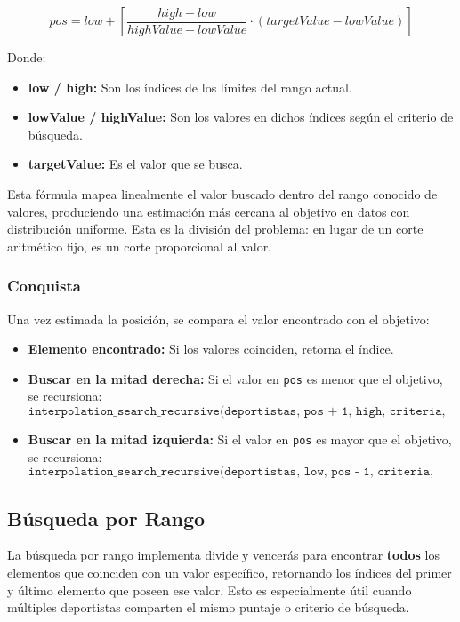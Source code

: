 \begin{equation}
    pos = low + \left[ \frac{high - low}{highValue - lowValue} \cdot (targetValue - lowValue) \right]
\end{equation}

Donde:
\begin{itemize}
    \item \textbf{low / high:} Son los índices de los límites del rango actual.
    \item \textbf{lowValue / highValue:} Son los valores en dichos índices según el criterio de búsqueda.
    \item \textbf{targetValue:} Es el valor que se busca.
\end{itemize}

Esta fórmula mapea linealmente el valor buscado dentro del rango conocido de valores, produciendo una estimación más cercana al objetivo en datos con distribución uniforme. Esta es la división del problema: en lugar de un corte aritmético fijo, es un corte proporcional al valor.

\subsubsection{Conquista}
Una vez estimada la posición, se compara el valor encontrado con el objetivo:

\begin{itemize}
    \item \textbf{Elemento encontrado:} Si los valores coinciden, retorna el índice.
    
    \item \textbf{Buscar en la mitad derecha:} Si el valor en \texttt{pos} es menor que el objetivo, se recursiona:
    \[
    \texttt{interpolation\_search\_recursive(deportistas, pos + 1, high, criteria, targetValue)}
    \]
    
    \item \textbf{Buscar en la mitad izquierda:} Si el valor en \texttt{pos} es mayor que el objetivo, se recursiona:
    \[
    \texttt{interpolation\_search\_recursive(deportistas, low, pos - 1, criteria, targetValue)}
    \]
\end{itemize}

\subsection{Búsqueda por Rango}

La búsqueda por rango implementa divide y vencerás para encontrar \textbf{todos} los elementos que coinciden con un valor específico, retornando los índices del primer y último elemento que poseen ese valor. Esto es especialmente útil cuando múltiples deportistas comparten el mismo puntaje o criterio de búsqueda.

